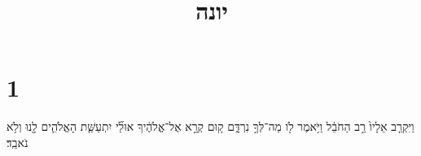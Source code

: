 \documentclass{openreader}
\title{יונה}
\date{}
\begin{document}
\maketitle
\raggedbottom 
\fontsize{16pt}{24pt}\selectfont
\section*{1}
וַיִּקְרַ֤ב אֵלָיו֙ רַ֣ב הַחֹבֵ֔ל וַיֹּ֥אמֶר לֹ֖ו מַה־לְּךָ֣ נִרְדָּ֑ם ק֚וּם קְרָ֣א אֶל־אֱלֹהֶ֔יךָ אוּלַ֞י יִתְעַשֵּׁ֧ת הָאֱלֹהִ֛ים לָ֖נוּ וְלֹ֥א נֹאבֵֽד׃ 
\end{document}
